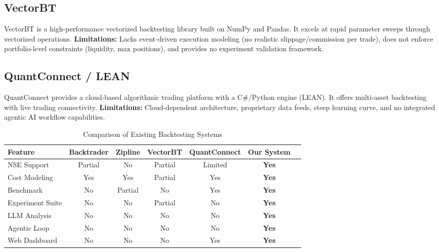 \subsection{VectorBT}
VectorBT is a high-performance vectorized backtesting library built on NumPy and Pandas. It excels at rapid parameter sweeps through vectorized operations. \textbf{Limitations:} Lacks event-driven execution modeling (no realistic slippage/commission per trade), does not enforce portfolio-level constraints (liquidity, max positions), and provides no experiment validation framework.

\subsection{QuantConnect / LEAN}
QuantConnect provides a cloud-based algorithmic trading platform with a C\#/Python engine (LEAN). It offers multi-asset backtesting with live trading connectivity. \textbf{Limitations:} Cloud-dependent architecture, proprietary data feeds, steep learning curve, and no integrated agentic AI workflow capabilities.

\vspace{0.5cm}
\begin{table}[H]
\centering
\caption{Comparison of Existing Backtesting Systems}
\label{tab:existingsystems}
\small
\begin{tabular}{|p{2.3cm}|c|c|c|c|c|c|}
\hline
\textbf{Feature} & \textbf{Backtrader} & \textbf{Zipline} & \textbf{VectorBT} & \textbf{QuantConnect} & \textbf{Our System} \\
\hline
NSE Support & Partial & No & Partial & Limited & \textbf{Yes} \\
\hline
Cost Modeling & Yes & Yes & Partial & Yes & \textbf{Yes} \\
\hline
Benchmark & No & Partial & No & Yes & \textbf{Yes} \\
\hline
Experiment Suite & No & No & Partial & No & \textbf{Yes} \\
\hline
LLM Analysis & No & No & No & No & \textbf{Yes} \\
\hline
Agentic Loop & No & No & No & No & \textbf{Yes} \\
\hline
Web Dashboard & No & No & No & Yes & \textbf{Yes} \\
\hline
\end{tabular}
\end{table}

